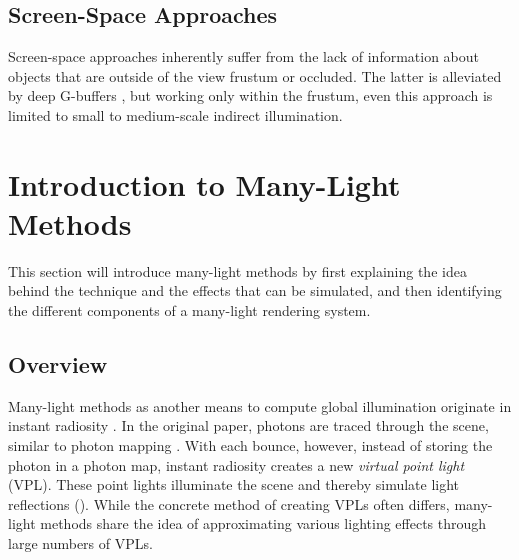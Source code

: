 \subsection{Screen-Space Approaches}

Screen-space approaches inherently suffer from the lack of information about objects that are outside of the view frustum or occluded. The latter is alleviated by deep G-buffers \citep{Mara:2014:DeepGBuffers, Mara:2016:DeepGBuffers2}, but working only within the frustum, even this approach is limited to small to medium-scale indirect illumination.



\section{Introduction to Many-Light Methods}

This section will introduce many-light methods by first explaining the idea behind the technique and the effects that can be simulated, and then identifying the different components of a many-light rendering system.

\subsection{Overview}

Many-light methods as another means to compute global illumination originate in instant radiosity \citep{Keller:1997:InstantRadiosity}. In the original paper, photons are traced through the scene, similar to photon mapping \citep{Jensen:1996:PhotonMapping}. With each bounce, however, instead of storing the photon in a photon map, instant radiosity creates a new \emph{virtual point light} (VPL). These point lights illuminate the scene and thereby simulate light reflections (). While the concrete method of creating VPLs often differs, many-light methods share the idea of approximating various lighting effects through large numbers of VPLs.

